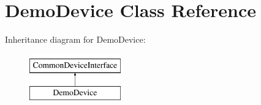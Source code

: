 \hypertarget{class_demo_device}{}\section{Demo\+Device Class Reference}
\label{class_demo_device}
Inheritance diagram for Demo\+Device\+:\begin{figure}[H]
\begin{center}
\leavevmode
\includegraphics[height=2.000000cm]{class_demo_device}
\end{center}
\end{figure}
